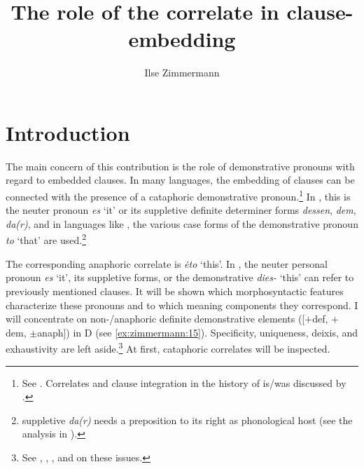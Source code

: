 \documentclass[output=paper]{langscibook}
\author{Ilse Zimmermann\affiliation{Leibniz-Zentrum Allgemeine Sprachwissenschaft Berlin}}
\title[The role of the correlate in clause-embedding]
      {The role of the correlate in clause-embedding}
\begin{document}
\abovedisplayskip=0pt
\maketitle

\section{Introduction}\label{s:1}

The main concern of this contribution is the role of demonstrative pronouns with regard to embedded clauses. In many languages, the embedding of clauses can be connected with the presence of a cataphoric demonstrative pronoun.\footnote{See \citet{Pütz1986,Sudhoff2003,Sudhoff2016,Mollica2010,Willer-Gold2013,SchwabeFreyMeinunger2016,Bondaruk2015,Knjazev2016,Zimmermann1967,Zimmermann1983,Zimmermann1993,Zimmermann2016b,Zimmermann2016a,Zimmermann2018a,Zimmermann2019c}. Correlates and clause integration in the history of  is/was discussed by \citet{Axel2009,Axel-Tober2011}.}
In , this is the neuter pronoun \textit{es} `it' or its suppletive definite determiner forms \textit{dessen}, \textit{dem}, \textit{da(r)}, and in  languages like , the various case forms of the demonstrative pronoun \textit{to} `that' are used.\footnote{ suppletive \textit{da(r)} needs a preposition to its right as phonological host (see the analysis in \citealt{Breindl1989}).}

The corresponding anaphoric correlate is \textit{ėto} `this'. In , the neuter personal pronoun \textit{es} `it', its suppletive forms, or the demonstrative \textit{dies-} `this' can refer to previously mentioned clauses. It will be shown which morphosyntactic features characterize these pronouns and to which meaning components they correspond. I will concentrate on non-/anaphoric definite demonstrative elements ([$+$def, $+$dem, $\pm$anaph]) in D (see \ref{ex:zimmermann:15}). Specificity, uniqueness, deixis, and exhaustivity are left aside.\footnote{See  \citet{Schwarz2009}, \citet{Simik2016}, \citet{Bombi2018}, and \citet{Borik2019} on these issues.} At first, cataphoric correlates will be inspected.
\end{document}
